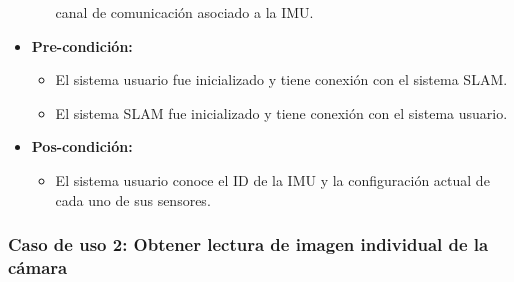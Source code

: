 \documentclass[12pt,a4paper, twosite]{article}
\begin{document}
\begin{itemize}
\begin{itemize}
    canal de comunicación asociado a la IMU.
  \end{itemize}
  \item \textbf{Pre-condición:}
  \begin{itemize}
    \item El sistema usuario fue inicializado y tiene conexión con el sistema SLAM.
    \item El sistema SLAM fue inicializado y tiene conexión con el sistema usuario.
  \end{itemize}
  \item \textbf{Pos-condición:}
  \begin{itemize}
    \item El sistema usuario conoce el ID de la IMU y la configuración actual de cada uno
    de sus sensores.
  \end{itemize}
\end{itemize}

\subsubsection*{Caso de uso 2: Obtener lectura de imagen individual de la cámara}
\end{document}
